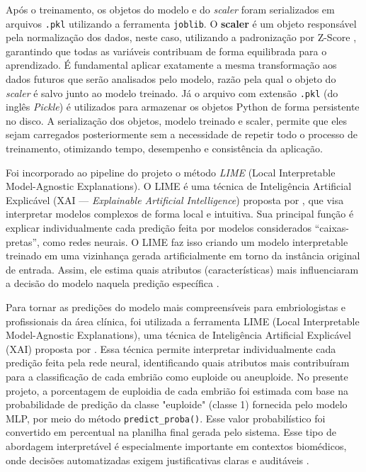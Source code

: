 Após o treinamento, os objetos do modelo e do \textit{scaler} foram serializados em arquivos \texttt{.pkl} utilizando a ferramenta \texttt{joblib}. O \textbf{scaler} é um objeto responsável pela normalização dos dados, neste caso, utilizando a padronização por Z-Score \cite{geron2017}, garantindo que todas as variáveis contribuam de forma equilibrada para o aprendizado. É fundamental aplicar exatamente a mesma transformação aos dados futuros que serão analisados pelo modelo, razão pela qual o objeto do \textit{scaler} é salvo junto ao modelo treinado. Já o arquivo com extensão \texttt{.pkl} (do inglês \textit{Pickle}) é utilizados para armazenar os objetos Python de forma persistente no disco. A serialização dos objetos, modelo treinado e scaler, permite que eles sejam carregados posteriormente sem a necessidade de repetir todo o processo de treinamento, otimizando tempo, desempenho e consistência da aplicação.

Foi incorporado ao pipeline do projeto o método \textit{LIME} (Local Interpretable Model-Agnostic Explanations). O LIME é uma técnica de Inteligência Artificial Explicável (XAI — \textit{Explainable Artificial Intelligence}) proposta por , que visa interpretar modelos complexos de forma local e intuitiva. Sua principal função é explicar individualmente cada predição feita por modelos considerados “caixas-pretas”, como redes neurais. O LIME faz isso criando um modelo interpretable treinado em uma vizinhança gerada artificialmente em torno da instância original de entrada. Assim, ele estima quais atributos (características) mais influenciaram a decisão do modelo naquela predição específica \cite{ribeiro2016}. 

Para tornar as predições do modelo mais compreensíveis para embriologistas e profissionais da área clínica, foi utilizada a ferramenta LIME (Local Interpretable Model-Agnostic Explanations), uma técnica de Inteligência Artificial Explicável (XAI) proposta por . Essa técnica permite interpretar individualmente cada predição feita pela rede neural, identificando quais atributos mais contribuíram para a classificação de cada embrião como euploide ou aneuploide. No presente projeto, a porcentagem de euploidia de cada embrião foi estimada com base na probabilidade de predição da classe "euploide" (classe 1) fornecida pelo modelo MLP, por meio do método \texttt{predict\_proba()}. Esse valor probabilístico foi convertido em percentual  na planilha final gerada pelo sistema. Esse tipo de abordagem interpretável é especialmente importante em contextos biomédicos, onde decisões automatizadas exigem justificativas claras e auditáveis \cite{arrieta2020, ribeiro2016}.

